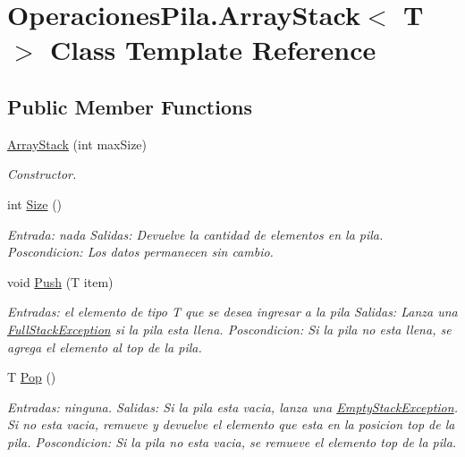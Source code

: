 \hypertarget{class_operaciones_pila_1_1_array_stack}{}\section{Operaciones\+Pila.\+Array\+Stack$<$ T $>$ Class Template Reference}
\label{class_operaciones_pila_1_1_array_stack}
\subsection*{Public Member Functions}
\begin{DoxyCompactItemize}
\item 
\hyperlink{class_operaciones_pila_1_1_array_stack_a71fa2281672474bbef92556bf944a176}{Array\+Stack} (int max\+Size)
\begin{DoxyCompactList}\small\item\em Constructor. \end{DoxyCompactList}\item 
int \hyperlink{class_operaciones_pila_1_1_array_stack_aef6d20149157d51dafe5c7a0c70275a9}{Size} ()
\begin{DoxyCompactList}\small\item\em Entrada\+: nada Salidas\+: Devuelve la cantidad de elementos en la pila. Poscondicion\+: Los datos permanecen sin cambio. \end{DoxyCompactList}\item 
void \hyperlink{class_operaciones_pila_1_1_array_stack_a24832d21024200fba53690fe399277e6}{Push} (T item)
\begin{DoxyCompactList}\small\item\em Entradas\+: el elemento de tipo T que se desea ingresar a la pila Salidas\+: Lanza una \hyperlink{class_operaciones_pila_1_1_full_stack_exception}{Full\+Stack\+Exception} si la pila esta llena. Poscondicion\+: Si la pila no esta llena, se agrega el elemento al top de la pila. \end{DoxyCompactList}\item 
T \hyperlink{class_operaciones_pila_1_1_array_stack_a077d65f90d9b421a881dab181e136147}{Pop} ()
\begin{DoxyCompactList}\small\item\em Entradas\+: ninguna. Salidas\+: Si la pila esta vacia, lanza una \hyperlink{class_operaciones_pila_1_1_empty_stack_exception}{Empty\+Stack\+Exception}. Si no esta vacia, remueve y devuelve el elemento que esta en la posicion top de la pila. Poscondicion\+: Si la pila no esta vacia, se remueve el elemento top de la pila. \end{DoxyCompactList}\item 

\end{DoxyCompactItemize}
